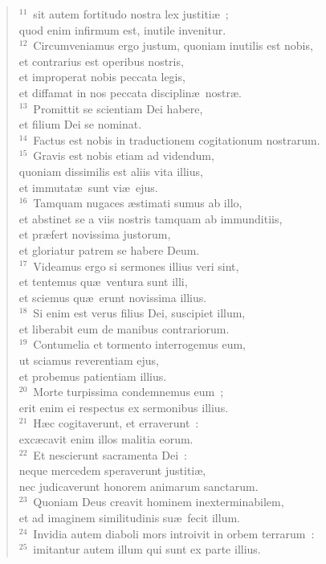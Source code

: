 \begin{verse}
${}^{11}$~sit autem fortitudo nostra lex justiti\ae~;\\ quod enim infirmum est, inutile invenitur.\\
${}^{12}$~Circumveniamus ergo justum, quoniam inutilis est nobis,\\ et contrarius est operibus nostris,\\ et improperat nobis peccata legis,\\ et diffamat in nos peccata disciplin\ae\ nostr\ae .\\
${}^{13}$~Promittit se scientiam Dei habere,\\ et filium Dei se nominat.\\
${}^{14}$~Factus est nobis in traductionem cogitationum nostrarum.\\
${}^{15}$~Gravis est nobis etiam ad videndum,\\ quoniam dissimilis est aliis vita illius,\\ et immutat\ae\ sunt vi\ae\ ejus.\\
${}^{16}$~Tamquam nugaces \ae stimati sumus ab illo,\\ et abstinet se a viis nostris tamquam ab immunditiis,\\ et pr\ae fert novissima justorum,\\ et gloriatur patrem se habere Deum.\\
${}^{17}$~Videamus ergo si sermones illius veri sint,\\ et tentemus qu\ae\ ventura sunt illi,\\ et sciemus qu\ae\ erunt novissima illius.\\
${}^{18}$~Si enim est verus filius Dei, suscipiet illum,\\ et liberabit eum de manibus contrariorum.\\
${}^{19}$~Contumelia et tormento interrogemus eum,\\ ut sciamus reverentiam ejus,\\ et probemus patientiam illius.\\
${}^{20}$~Morte turpissima condemnemus eum~;\\ erit enim ei respectus ex sermonibus illius.\\
${}^{21}$~H\ae c cogitaverunt, et erraverunt~:\\ exc\ae cavit enim illos malitia eorum.\\
${}^{22}$~Et nescierunt sacramenta Dei~:\\ neque mercedem speraverunt justiti\ae ,\\ nec judicaverunt honorem animarum sanctarum.\\
${}^{23}$~Quoniam Deus creavit hominem inexterminabilem,\\ et ad imaginem similitudinis su\ae\ fecit illum.\\
${}^{24}$~Invidia autem diaboli mors introivit in orbem terrarum~:\\
${}^{25}$~imitantur autem illum qui sunt ex parte illius.\end{verse}


